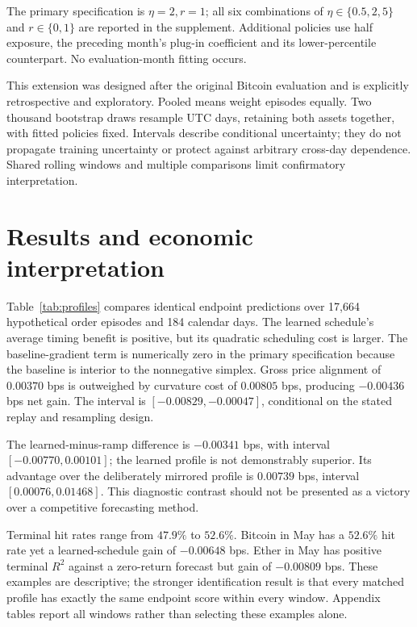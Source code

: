 \documentclass[11pt]{article}
\begin{document}
The primary specification is $\eta=2,r=1$; all six combinations of $\eta\in\{0.5,2,5\}$ and $r\in\{0,1\}$ are reported in the supplement. Additional policies use half exposure, the preceding month's plug-in coefficient and its lower-percentile counterpart. No evaluation-month fitting occurs.

This extension was designed after the original Bitcoin evaluation and is explicitly retrospective and exploratory. Pooled means weight episodes equally. Two thousand bootstrap draws resample UTC days, retaining both assets together, with fitted policies fixed. Intervals describe conditional uncertainty; they do not propagate training uncertainty or protect against arbitrary cross-day dependence. Shared rolling windows and multiple comparisons limit confirmatory interpretation.

\section{Results and economic interpretation}
Table~\ref{tab:profiles} compares identical endpoint predictions over 17,664 hypothetical order episodes and 184 calendar days. The learned schedule's average timing benefit is positive, but its quadratic scheduling cost is larger. The baseline-gradient term is numerically zero in the primary specification because the baseline is interior to the nonnegative simplex. Gross price alignment of $0.00370$ bps is outweighed by curvature cost of $0.00805$ bps, producing $-0.00436$ bps net gain. The interval is $[-0.00829,-0.00047]$, conditional on the stated replay and resampling design.

\begin{table}[htbp]
\centering\small
\caption{Matched endpoint forecasts, different execution outcomes. All entries are basis points under hypothetical costs. Parallel gains are analytically zero; raw numerical residuals are below $1.5\times10^{-14}$ in absolute mean gain.}\label{tab:profiles}
\resizebox{\linewidth}{!}{}
\end{table}

The learned-minus-ramp difference is $-0.00341$ bps, with interval $[-0.00770,0.00101]$; the learned profile is not demonstrably superior. Its advantage over the deliberately mirrored profile is $0.00739$ bps, interval $[0.00076,0.01468]$. This diagnostic contrast should not be presented as a victory over a competitive forecasting method.

Terminal hit rates range from $47.9\%$ to $52.6\%$. Bitcoin in May has a $52.6\%$ hit rate yet a learned-schedule gain of $-0.00648$ bps. Ether in May has positive terminal $R^2$ against a zero-return forecast but gain of $-0.00809$ bps. These examples are descriptive; the stronger identification result is that every matched profile has exactly the same endpoint score within every window. Appendix tables report all windows rather than selecting these examples alone.
\end{document}
